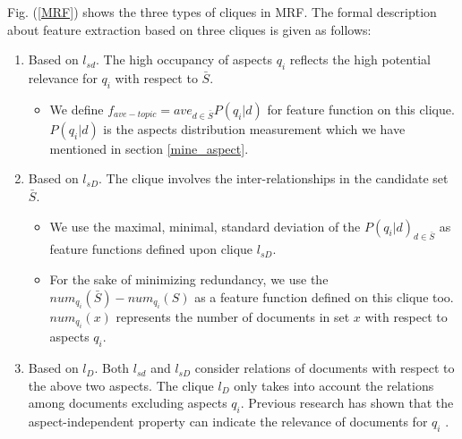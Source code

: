 \documentclass[review]{elsarticle}
\begin{document}
Fig. (\ref{MRF}) shows the three types of cliques in MRF. The formal description about feature extraction based on three cliques is given as follows:
\begin{enumerate}
	\item Based on $l_{sd}$. The high occupancy of aspects $q_i$ reflects the high potential relevance for $q_i$ with respect to $\bar{S}$.

		\begin{itemize}
			\item We define $f_{ave-topic}=ave_{d\in \bar{S}}P(q_i|d)$ for feature function on this clique. $P(q_i|d)$ is the aspects distribution measurement which we have mentioned in section \ref{mine_aspect}.
		\end{itemize}
	\item Based on $l_{sD}$. The clique involves the inter-relationships in the candidate set $\bar{S}$.
		\begin{itemize}
			\item We use the maximal, minimal, standard deviation of the $P(q_i|d)_{d\in \bar{S}}$ as feature functions defined upon clique $l_{sD}$.
			\item For the sake of minimizing redundancy, we use the $num_{q_i}(\bar{S})-num_{q_i}(S)$ as a feature function defined on this clique too. $num_{q_i}(x)$ represents the number of documents in set $x$ with respect to aspects $q_i$.
		\end{itemize}
	\item Based on $l_D$. Both $l_{sd}$ and $l_{sD}$ consider relations of documents with respect to the above two aspects. The clique $l_D$ only takes into account the relations among documents excluding aspects $q_i$. Previous research has shown that the aspect-independent property can indicate the relevance of documents for $q_i$ \cite{kurland2008rank}.

\end{enumerate}
\end{document}
